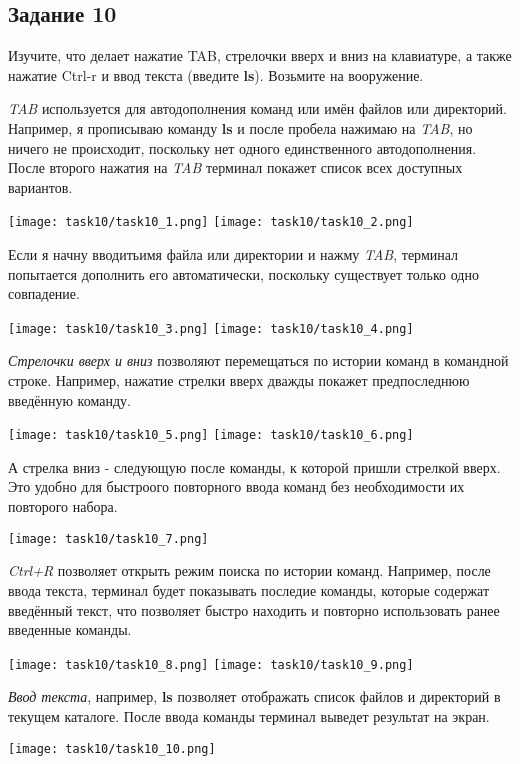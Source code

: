 \documentclass[12pt, a4paper]{report}
\begin{document}
			\subsection*{Задание 10}
			Изучите, что делает нажатие TAB, стрелочки вверх и вниз на клавиатуре, а также нажатие Ctrl-r и ввод текста (введите \textbf{ls}). Возьмите на вооружение. \par
			\textit{TAB} используется для автодополнения команд или имён файлов или директорий. Например, я прописываю команду \textbf{ls} и после пробела нажимаю на \textit{TAB}, но ничего не происходит, поскольку нет одного единственного автодополнения. После второго нажатия на \textit{TAB} терминал покажет список всех доступных вариантов.
			\begin{center}
				\texttt{[image: task10/task10\_1.png]}
				\texttt{[image: task10/task10\_2.png]}
			\end{center} \par
			Если я начну вводитьимя файла или директории и нажму \textit{TAB}, терминал попытается дополнить его автоматически, поскольку существует только одно совпадение.
			\begin{center}
				\texttt{[image: task10/task10\_3.png]}
				\texttt{[image: task10/task10\_4.png]}
			\end{center} \par
			\textit{Стрелочки вверх и вниз} позволяют перемещаться по истории команд в командной строке. Например, нажатие стрелки вверх дважды покажет предпоследнюю введённую команду.	
			\begin{center}
				\texttt{[image: task10/task10\_5.png]}
				\texttt{[image: task10/task10\_6.png]}
			\end{center} \par
			А стрелка вниз - следующую после команды, к которой пришли стрелкой вверх. Это удобно для быстроого повторного ввода команд без необходимости их повторого набора.
			\begin{center}
				\texttt{[image: task10/task10\_7.png]}
			\end{center} \par
			\textit{Ctrl+R} позволяет открыть режим поиска по истории команд. Например, после ввода текста, терминал будет показывать последие команды, которые содержат введённый текст, что позволяет быстро находить и повторно использовать ранее введенные команды.
			\begin{center}
				\texttt{[image: task10/task10\_8.png]}
				\texttt{[image: task10/task10\_9.png]}
			\end{center} \par
			\textit{Ввод текста}, например, \textbf{ls} позволяет отображать список файлов и директорий в текущем каталоге. После ввода команды терминал выведет результат на экран.
			\begin{center}
				\texttt{[image: task10/task10\_10.png]}
			\end{center}
\end{document}
